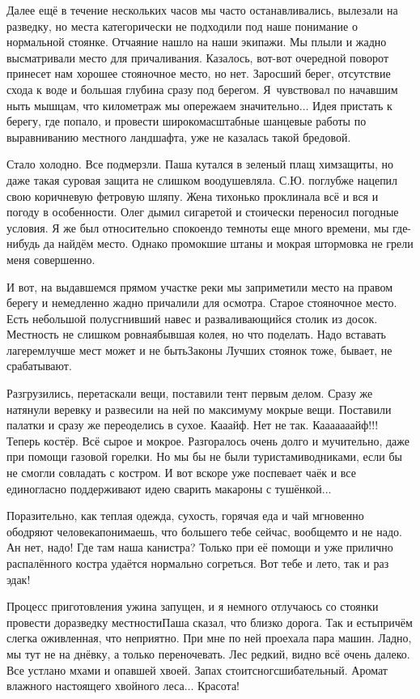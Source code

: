 Далее ещё в течение нескольких часов мы часто останавливались, вылезали на разведку, но места категорически не подходили под наше понимание о нормальной стоянке. Отчаяние нашло на наши экипажи. Мы плыли и жадно высматривали место для причаливания. Казалось, вот-вот очередной поворот принесет нам хорошее стояночное место, но нет. Заросший берег, отсутствие схода к воде и большая глубина сразу под берегом. Я~чувствовал по начавшим ныть мышцам, что километраж мы опережаем значительно$\ldots$ Идея пристать к берегу, где попало, и провести широкомасштабные шанцевые работы по выравниванию местного ландшафта, уже не казалась такой бредовой.

Стало холодно. Все подмерзли. Паша кутался в зеленый плащ химзащиты, но даже такая суровая защита не слишком воодушевляла. С.Ю. поглубже нацепил свою коричневую фетровую шляпу. Жена тихонько проклинала всё и вся и погоду в особенности. Олег дымил сигаретой и стоически переносил погодные условия. Я же был относительно спокоен\mdash до темноты еще много времени, мы где-нибудь да найдём место. Однако промокшие штаны и мокрая штормовка не грели меня совершенно.

И вот, на выдавшемся прямом участке реки мы заприметили место на правом берегу и немедленно жадно причалили для осмотра. Старое стояночное место. Есть небольшой полусгнивший навес и разваливающийся столик из досок. Местность не слишком ровная\mdash бывшая колея, но что поделать. Надо вставать лагерем\mdash лучше мест может и не быть\mdash Законы Лучших стоянок тоже, бывает, не срабатывают.

Разгрузились, перетаскали вещи, поставили тент первым делом. Сразу же натянули веревку и развесили на ней по максимуму мокрые вещи. Поставили палатки и сразу же переоделись в сухое. Ка\sdash а\sdash айф. Нет не так. К\sdash а\sdash а\sdash а\sdash а\sdash а\sdash а\sdash айф!!! Теперь костёр. Всё сырое и мокрое. Разгоралось очень долго и мучительно, даже при помощи газовой горелки. Но мы бы не были туристами\sdash водниками, если бы не смогли совладать с костром. И вот вскоре уже поспевает чаёк и все единогласно поддерживают идею сварить макароны с тушёнкой$\ldots$

Поразительно, как теплая одежда, сухость, горячая еда и чай мгновенно ободряют человека\mdash понимаешь, что большего тебе сейчас, вообщем\sdash то и не надо. Ан нет, надо! Где там наша канистра? Только при её помощи и уже прилично распалённого костра удаётся нормально согреться. Вот тебе и лето, так и раз эдак! 
 
Процесс приготовления ужина запущен, и я немного отлучаюсь со стоянки провести доразведку местности\mdash Паша сказал, что близко дорога. Так и есть\mdash причём слегка оживленная, что неприятно. При мне по ней проехала пара машин. Ладно, мы тут не на днёвку, а только переночевать. Лес редкий, видно всё очень далеко. Все устлано мхами и опавшей хвоей. Запах стоит\mdash сногсшибательный. Аромат влажного настоящего хвойного леса$\ldots$ Красота!

